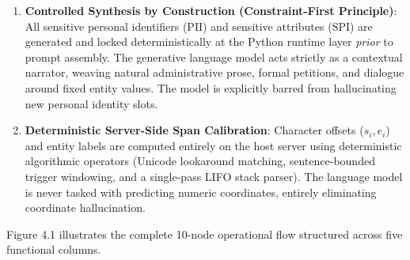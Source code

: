 \documentclass[
]{article}
\providecommand{\tightlist}{%
  \setlength{\itemsep}{0pt}\setlength{\parskip}{0pt}}
\begin{document}
\begin{enumerate}
\def\labelenumi{\arabic{enumi}.}
\tightlist
\item
  \textbf{Controlled Synthesis by Construction (Constraint-First
  Principle)}: All sensitive personal identifiers (\(\text{PII}\)) and
  sensitive attributes (\(\text{SPI}\)) are generated and locked
  deterministically at the Python runtime layer \emph{prior} to prompt
  assembly. The generative language model acts strictly as a contextual
  narrator, weaving natural administrative prose, formal petitions, and
  dialogue around fixed entity values. The model is explicitly barred
  from hallucinating new personal identity slots.
\item
  \textbf{Deterministic Server-Side Span Calibration}: Character offsets
  (\(s_i, e_i\)) and entity labels are computed entirely on the host
  server using deterministic algorithmic operators (Unicode lookaround
  matching, sentence-bounded trigger windowing, and a single-pass LIFO
  stack parser). The language model is never tasked with predicting
  numeric coordinates, entirely eliminating coordinate hallucination.
\end{enumerate}

Figure 4.1 illustrates the complete 10-node operational flow structured
across five functional columns.
\end{document}
